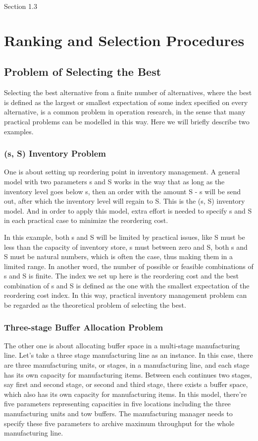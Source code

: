 \documentclass[12pt,a4]{report}
\begin{document}
Section 1.3


\chapter{Ranking and Selection Procedures}

\section{Problem of Selecting the Best}

Selecting the best alternative from a finite number of alternatives, where the best is defined as the largest or smallest expectation of some index specified on every alternative, is a common problem in operation research, in the sense that many practical problems can be modelled in this way. Here we will briefly describe two examples.

\subsection{(s, S) Inventory Problem}

One is about setting up reordering point in inventory management. A general model with two parameters s and S works in the way that as long as the inventory level goes below s, then an order with the amount S - s will be send out, after which the inventory level will regain to S. This is the (s, S) inventory model. And in order to apply this model, extra effort is needed to specify s and S in each practical case to minimize the reordering cost.

In this example, both s and S will be limited by practical issues, like S must be less than the capacity of inventory store, s must between zero and S, both s and S must be natural numbers, which is   often the case, thus making them in a limited range. In another word, the number of possible or feasible combinations of s and S is finite. The index we set up here is the reordering cost and the best combination of s and S is defined as the one with the smallest expectation of the reordering cost index. In this way, practical inventory management problem can be regarded as the theoretical problem of selecting the best.

\subsection{Three-stage Buffer Allocation Problem}

The other one is about allocating buffer space in a multi-stage manufacturing line. Let's take a three stage manufacturing line as an instance. In this case, there are three manufacturing units, or stages, in a manufacturing line, and each stage has its own capacity for manufacturing items. Between each continues two stages, say first and second stage, or second and third stage, there exists a buffer space, which also has its own capacity for manufacturing items. In this model, there're five parameters representing capacities in five locations including the three manufacturing units and tow buffers. The manufacturing manager needs to specify these five parameters to archive maximum throughput for the whole manufacturing line.
\end{document}
